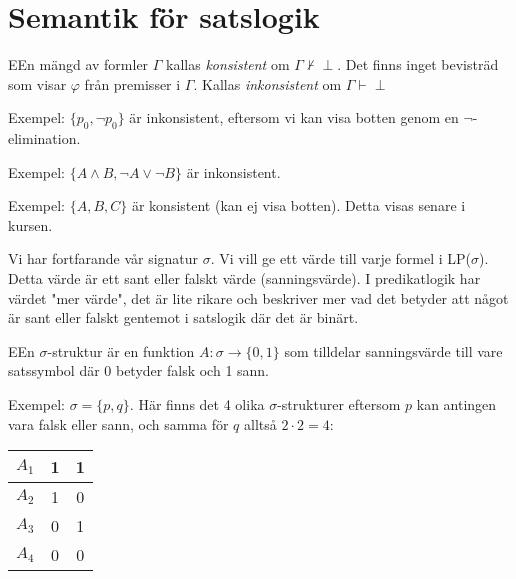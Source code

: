 \section{Semantik för satslogik}

\begin{theo}
  EEn mängd av formler $\Gamma$ kallas \textit{konsistent} om $\Gamma\nvdash\perp$. Det finns inget bevisträd som visar $\varphi$ från premisser i $\Gamma$. Kallas \textit{inkonsistent} om $\Gamma\vdash\perp$
\end{theo}
\par\bigskip
\noindent Exempel: $\{p_0,\neg p_0\}$ är inkonsistent, eftersom vi kan visa botten genom en $\neg$-elimination.
\par\bigskip
\noindent Exempel: $\{A\wedge B, \neg A\vee\neg B\}$ är inkonsistent.
\par\bigskip
\noindent Exempel: $\{A, B, C\}$ är konsistent (kan ej visa botten). Detta visas senare i kursen.
\par\bigskip
\noindent Vi har fortfarande vår signatur $\sigma$. Vi vill ge ett värde till varje formel i LP($\sigma$). Detta värde är ett sant eller falskt värde (sanningsvärde). I predikatlogik har värdet "mer värde", det är lite rikare och beskriver mer vad det betyder att något är sant eller falskt gentemot i satslogik där det är binärt.
\par\bigskip

\begin{theo}
  EEn $\sigma$-struktur är en funktion $A:\sigma\rightarrow\{0,1\}$ som tilldelar sanningsvärde till vare satssymbol där 0 betyder falsk och 1 sann.
\end{theo}
\par\bigskip
\noindent Exempel: $\sigma = \{p,q\}$. Här finns det 4 olika $\sigma$-strukturer eftersom $p$ kan antingen vara falsk eller sann, och samma för $q$ alltså $2\cdot2=4$:
\par\bigskip

\begin{center}
  \begin{tabular}{|c|c|c|}
    \hline
    $A_1$&1&1\\
    \hline
    $A_2$&1&0\\
    \hline
    $A_3$&0&1\\
    \hline
    $A_4$&0&0\\
    \hline
  \end{tabular}
\end{center}
\par\bigskip

